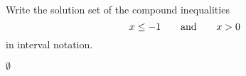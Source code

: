 

Write the solution set of the compound inequalities
\[x \leq -1\text{\quad\quad and\quad\quad} x >0 \]
in interval notation.

\begin{solution}
$\emptyset$
\end{solution}